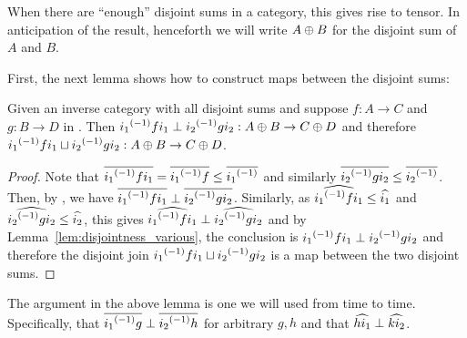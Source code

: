 When there are ``enough'' disjoint sums in a category, this gives rise to tensor. In anticipation of the result, henceforth we will write $A\oplus B$
for the disjoint sum of $A$ and $B$.

First, the next lemma shows how to construct maps between the disjoint sums:
\begin{lemma}\label{lem:disjoint_sum_maps_are_perp}
  Given \X an inverse category with all disjoint sums and suppose $f:A \to C$ and $g:B\to D$ in
  \X. Then  ${i_1}^{(-1)} f i_1 \perp {i_2}^{(-1)} g i_2 : A\oplus B\to C\oplus D$ and therefore
  ${i_1}^{(-1)} f i_1 \sqcup {i_2}^{(-1)} g i_2 : A\oplus B\to C\oplus D$.
\end{lemma}
\begin{proof}
  Note that $\overline{{i_1}^{(-1)} f i_1} = \overline{{i_1}^{(-1)} f} \le \overline{{i_1}^{(-1)}}$ and similarly
  $\overline{{i_2}^{(-1)} g i_2} \le \overline{{i_2}^{(-1)}}$. Then, by , we have
  $\overline{{i_1}^{(-1)} f i_1} \perp \overline{{i_2}^{(-1)} g i_2}$.
  Similarly, as $\widehat{{i_1}^{(-1)} f i_1} \le \widehat{i_1}$ and  $\widehat{{i_2}^{(-1)} g i_2} \le \widehat{i_2}$,
  this gives $\widehat{{i_1}^{(-1)} f i_1} \perp \widehat{{i_2}^{(-1)} g i_2}$ and by
  Lemma~\ref{lem:disjointness_various}, the conclusion is ${i_1}^{(-1)} f i_1\perp {i_2}^{(-1)} g i_2$
  and therefore the disjoint join ${i_1}^{(-1)} f i_1 \sqcup {i_2}^{(-1)} g i_2$ is a map between the two
  disjoint sums.
\end{proof}

The argument in the above lemma is one we will used from time to time. Specifically, that
$\overline{{i_1}^{(-1)} g} \perp \overline{{i_2}^{(-1)} h}$ for arbitrary $g,h$ and that
$\widehat{h i_1} \perp \widehat{k i_2}$.

